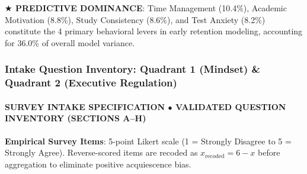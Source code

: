\documentclass[aspectratio=169, 10pt]{beamer}
\begin{document}
\begin{frame}
  \begin{takeawaybanner}
    \textbf{\color{GoldPill}$\bigstar$ PREDICTIVE DOMINANCE}: Time Management (10.4\%), Academic Motivation (8.8\%), Study Consistency (8.6\%), and Test Anxiety (8.2\%) constitute the 4 primary behavioral levers in early retention modeling, accounting for 36.0\% of overall model variance.
  \end{takeawaybanner}
\end{frame}

\begin{frame}
  \frametitle{Intake Question Inventory: Quadrant 1 (Mindset) \& Quadrant 2 (Executive Regulation)}
  \framesubtitle{SURVEY INTAKE SPECIFICATION $\bullet$ VALIDATED QUESTION INVENTORY (SECTIONS A--H)}

  \begin{topsummarybar}
    \fontsize{6.5pt}{7.8pt}\selectfont
    \textbf{\color{NavyDark}Empirical Survey Items}: 5-point Likert scale (1 = Strongly Disagree to 5 = Strongly Agree). Reverse-scored items are recoded as $x_{\text{recoded}} = 6 - x$ before aggregation to eliminate positive acquiescence bias.
  \end{topsummarybar}
  \vspace{-0.30cm}


\end{frame}
\end{document}
